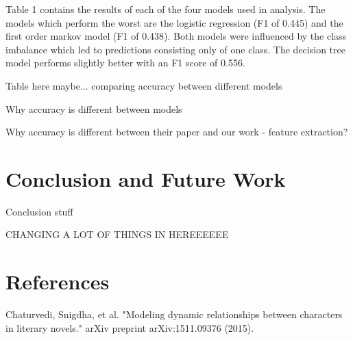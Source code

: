 \documentclass[11pt,a4paper]{article}
\begin{document}
Table 1 contains the results of each of the four models used in analysis. The models which perform the worst are the logistic regression (F1 of 0.445) and the first order markov model (F1 of 0.438). Both models were influenced by the class imbalance which led to predictions consisting only of one class. The decision tree model performs slightly better with an F1 score of 0.556.  

Table here maybe... comparing accuracy between different models 

Why accuracy is different between models

Why accuracy is different between their paper and our work - feature extraction?


\section{Conclusion and Future Work}
Conclusion stuff

CHANGING A LOT OF THINGS IN HEREEEEEE

\section{References}
Chaturvedi, Snigdha, et al. "Modeling dynamic relationships between characters in literary novels." arXiv preprint arXiv:1511.09376 (2015).



%
%
%
%
\end{document}
